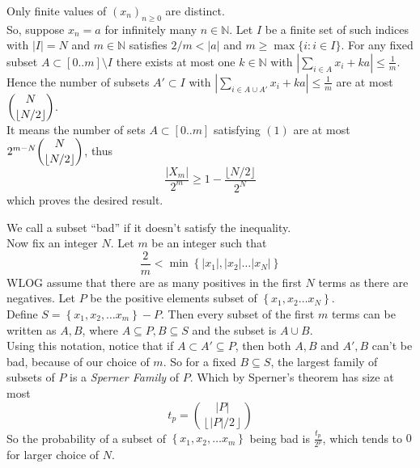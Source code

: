 \begin{solution}[dgrozev]
     Only finite values of $(x_n)_{n\ge 0}$ are distinct.\\

    So, suppose $x_n=a$ for infinitely many $n\in \mathbb{N}$. Let $I$ be a
    finite set of such indices with $|I|=N$ and $m\in \mathbb{N}$ satisfies
    $2/m<|a|$ and $m\geq \max\{i:i\in I\}$. For any fixed subset $A\subset
    [0..m]\setminus I$ there exists at most one $k\in\mathbb{N}$ with
    $\left|\sum_{i\in A}x_i+ka\right|\leq \frac{1}{m}$. Hence the number of
    subsets $A'\subset I$ with $\left|\sum_{i\in A\cup A'}x_i+ka\right|\leq
    \frac{1}{m}$ are at most $\dbinom{N}{\lfloor N/2\rfloor}$.\\

    It means the number of sets $A\subset [0..m]$ satisfying $(1)$ are at most
    $2^{m-N}\dbinom{N}{\lfloor N/2\rfloor}$, thus
    \[\displaystyle \frac{|X_m|}{2^m}\geq 1-\frac{\lfloor N/2\rfloor}{2^N}\]
    which proves the desired result.
\end{solution}

\begin{solution}
    We call a subset ``bad'' if it doesn't satisfy the inequality.\\

    Now fix an integer $N$. Let $m$ be an integer such that 
    \[\frac{2}{m}< \min \left\{\left|x_1\right|, \left|x_2\right|\dots
    \left|x_N\right|\right\}\] 
    WLOG assume that there are as many positives in the first $N$ terms as
    there are negatives. Let $P$ be the positive elements subset of
    $\left\{x_1, x_2\dots x_N\right\}$.\\

    Define $S = \left\{x_1, x_2, \dots x_m\right\} - P$. Then every subset of
    the first $m$ terms can be written as ${A, B}$, where $A\subseteq P,
    B\subseteq S$ and the subset is $A\cup B$. \\

    Using this notation, notice that if $A\subset A' \subseteq P$, then both
    ${A, B}$ and ${A', B}$ can't be bad, because of our choice of $m$. So for
    a fixed $B\subseteq S$, the largest family of subsets of $P$ is a
    \emph{Sperner Family} of $P$. Which by Sperner's theorem has size at most
    \[t_p = {\left|P\right| \choose \left\lfloor\left|P\right|/2\right\rfloor}\] 
    So the probability of a subset of $\left\{x_1, x_2,\dots x_m\right\}$
    being bad is $\frac{t_p}{2^p}$, which tends to $0$ for larger choice of
    $N$.
\end{solution}
